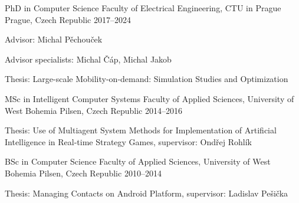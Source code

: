 

\begin{cventries}

  \cventry
    {PhD in Computer Science} %
    {Faculty of Electrical Engineering, CTU in Prague} %
    {Prague, Czech Republic} %
    {2017--2024} %
    {
      \begin{cvitems} %
        \item {Advisor: Michal Pěchouček}
        \item {Advisor specialists: Michal Čáp, Michal Jakob}
        \item {Thesis: Large-scale Mobility-on-demand: Simulation Studies and Optimization}
      \end{cvitems}
    }

  \cventry
    {MSc in Intelligent Computer Systems} %
    {Faculty of Applied Sciences, University of West Bohemia} %
    {Pilsen, Czech Republic} %
    {2014--2016} %
    {
      \begin{cvitems} %
        \item {Thesis: Use of Multiagent System Methods for Implementation of Artificial Intelligence in Real-time Strategy Games, supervisor:  Ondřej Rohlík}
      \end{cvitems}
    }

  \cventry
    {BSc in Computer Science} %
    {Faculty of Applied Sciences, University of West Bohemia} %
    {Pilsen, Czech Republic} %
    {2010--2014} %
    {
      \begin{cvitems} %
        \item {Thesis: Managing Contacts on Android Platform, supervisor: Ladislav Pešička}
      \end{cvitems}
    }

\end{cventries}
